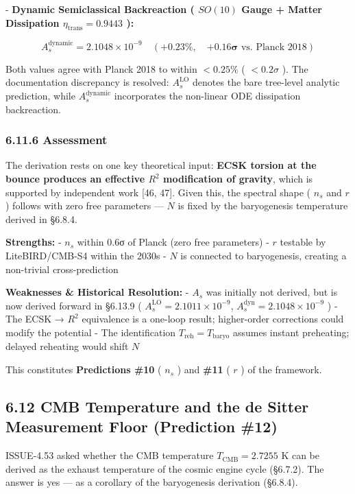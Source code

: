 \documentclass[11pt,a4paper]{article}
\theoremstyle{definition}
\theoremstyle{remark}
\begin{document}
- \textbf{Dynamic Semiclassical Backreaction ( $SO(10)$ Gauge + Matter Dissipation $\eta_{\text{trans}} = 0.9443$ ):}


\begin{equation}
A_s^{\text{dynamic}} = 2.1048 \times 10^{-9} \quad (\mathbf{+0.23\%}, \quad \mathbf{+0.16\sigma} \text{ vs. Planck 2018})
\end{equation}


Both values agree with Planck 2018 to within $< 0.25\%$ ( $< 0.2\sigma$ ). The documentation discrepancy is resolved: $A_s^{\text{LO}}$ denotes the bare tree-level analytic prediction, while $A_s^{\text{dynamic}}$ incorporates the non-linear ODE dissipation backreaction.

\subsubsection{6.11.6 Assessment}

The derivation rests on one key theoretical input: \textbf{ECSK torsion at the bounce produces an effective $R^2$ modification of gravity}, which is supported by independent work [46, 47]. Given this, the spectral shape ( $n_s$ and $r$ ) follows with zero free parameters — $N$ is fixed by the baryogenesis temperature derived in \S 6.8.4.

\textbf{Strengths:}
- $n_s$ within 0.6σ of Planck (zero free parameters)
- $r$ testable by LiteBIRD/CMB-S4 within the 2030s
- $N$ is connected to baryogenesis, creating a non-trivial cross-prediction

\textbf{Weaknesses \& Historical Resolution:}
- $A_s$ was initially not derived, but is now derived forward in \S 6.13.9 ( $A_s^{\text{LO}} = 2.1011 \times 10^{-9}$, $A_s^{\text{dyn}} = 2.1048 \times 10^{-9}$ )
- The ECSK → $R^2$ equivalence is a one-loop result; higher-order corrections could modify the potential
- The identification $T_{\text{reh}} = T_{\text{baryo}}$ assumes instant preheating; delayed reheating would shift $N$

This constitutes \textbf{Predictions \#10} ( $n_s$ ) and \textbf{\#11} ( $r$ ) of the framework.

\subsection{6.12 CMB Temperature and the de Sitter Measurement Floor (Prediction \#12)}

ISSUE-4.53 asked whether the CMB temperature $T_{\text{CMB}} = 2.7255$ K can be derived as the exhaust temperature of the cosmic engine cycle (\S 6.7.2). The answer is yes — as a corollary of the baryogenesis derivation (\S 6.8.4).
\end{document}
